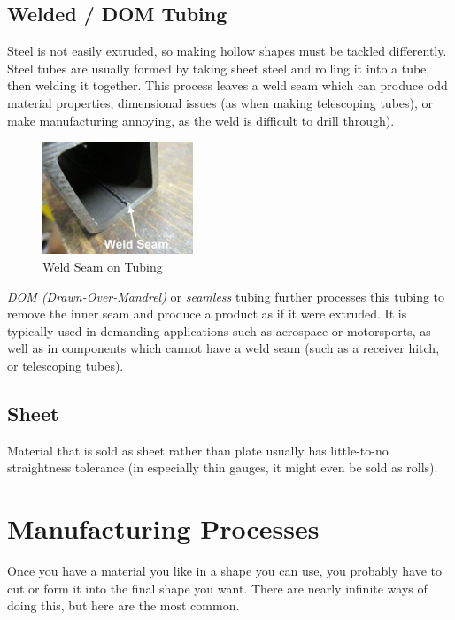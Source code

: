  \subsection{Welded / DOM Tubing} 
 Steel is not easily extruded, so making hollow shapes must be tackled differently. Steel tubes are usually formed by taking sheet steel and rolling it into a tube, then welding it together. This process leaves a weld seam which can produce odd material properties, dimensional issues (as when making telescoping tubes), or make manufacturing annoying, as the weld is difficult to drill through). 
 
   \begin{figure}[H]
	\centering
	\includegraphics[width=0.4\textwidth]{imgs/welded_tube_seam.png}
	
	\caption{Weld Seam on Tubing}
\end{figure}
 
 \textit{DOM (Drawn-Over-Mandrel)} or \textit{seamless} tubing further processes this tubing to remove the inner seam and produce a product as if it were extruded. It is typically used in demanding applications such as aerospace or motorsports, as well as in components which cannot have a weld seam (such as a receiver hitch, or telescoping tubes).
 
 \subsection{Sheet}
 Material that is sold as sheet rather than plate usually has little-to-no straightness tolerance (in especially thin gauges, it might even be sold as rolls).
 
 \section{Manufacturing Processes}
 
 Once you have a material you like in a shape you can use, you probably have to cut or form it into the final shape you want. There are nearly infinite ways of doing this, but here are the most common.
 
